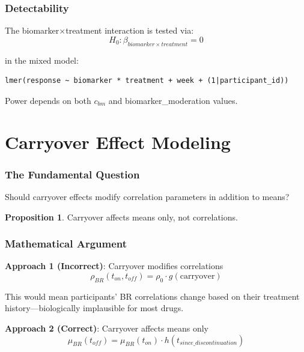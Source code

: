 \documentclass[11pt]{article}
\theoremstyle{definition}
\newtheorem{proposition}{Proposition}
\begin{document}
\section{Detectability}

The biomarker$\times$treatment interaction is tested via:
\begin{equation}
H_0: \beta_{biomarker \times treatment} = 0
\end{equation}

in the mixed model:
\begin{lstlisting}
lmer(response ~ biomarker * treatment + week + (1|participant_id))
\end{lstlisting}

Power depends on both $c_{bm}$ and biomarker\_moderation values.

\part{Carryover Effect Modeling}

\section{The Fundamental Question}

Should carryover effects modify correlation parameters in addition to means?

\begin{proposition}
Carryover affects means only, not correlations.
\end{proposition}

\section{Mathematical Argument}

\textbf{Approach 1 (Incorrect)}: Carryover modifies correlations
\begin{equation}
\rho_{BR}(t_{on}, t_{off}) = \rho_0 \cdot g(\text{carryover})
\end{equation}

This would mean participants' BR correlations change based on their treatment
history---biologically implausible for most drugs.

\textbf{Approach 2 (Correct)}: Carryover affects means only
\begin{equation}
\mu_{BR}(t_{off}) = \mu_{BR}(t_{on}) \cdot h(t_{since\_discontinuation})
\end{equation}
\end{document}

